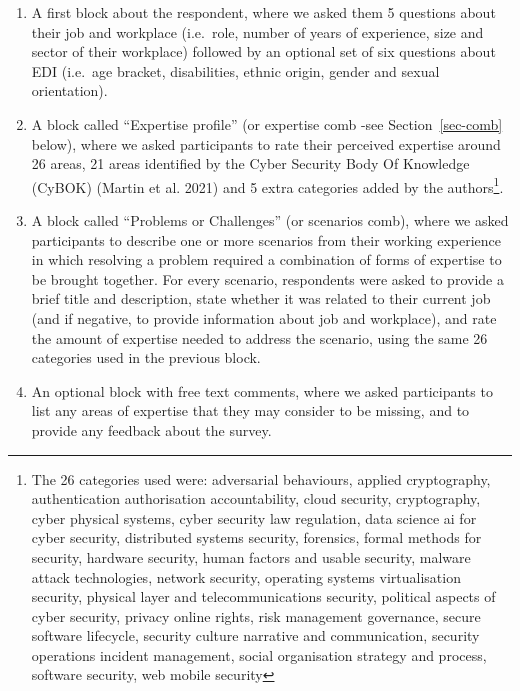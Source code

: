 \documentclass[
  a4paper,
]{book}
\begin{document}
\begin{enumerate}
\def\labelenumi{\arabic{enumi}.}
\item
  A first block about the respondent, where we asked them 5 questions
  about their job and workplace (i.e.~role, number of years of
  experience, size and sector of their workplace) followed by an
  optional set of six questions about EDI (i.e.~age bracket,
  disabilities, ethnic origin, gender and sexual orientation).
\item
  A block called ``Expertise profile'' (or expertise comb -see
  Section~\ref{sec-comb} below), where we asked participants to rate
  their perceived expertise around 26 areas, 21 areas identified by the
  Cyber Security Body Of Knowledge (CyBOK) (Martin et al. 2021) and 5
  extra categories added by the authors\footnote{The 26 categories used
    were: adversarial behaviours, applied cryptography, authentication
    authorisation accountability, cloud security, cryptography, cyber
    physical systems, cyber security law regulation, data science ai for
    cyber security, distributed systems security, forensics, formal
    methods for security, hardware security, human factors and usable
    security, malware attack technologies, network security, operating
    systems virtualisation security, physical layer and
    telecommunications security, political aspects of cyber security,
    privacy online rights, risk management governance, secure software
    lifecycle, security culture narrative and communication, security
    operations incident management, social organisation strategy and
    process, software security, web mobile security}.
\item
  A block called ``Problems or Challenges'' (or scenarios comb), where
  we asked participants to describe one or more scenarios from their
  working experience in which resolving a problem required a combination
  of forms of expertise to be brought together. For every scenario,
  respondents were asked to provide a brief title and description, state
  whether it was related to their current job (and if negative, to
  provide information about job and workplace), and rate the amount of
  expertise needed to address the scenario, using the same 26 categories
  used in the previous block.
\item
  An optional block with free text comments, where we asked participants
  to list any areas of expertise that they may consider to be missing,
  and to provide any feedback about the survey.
\end{enumerate}
\end{document}
